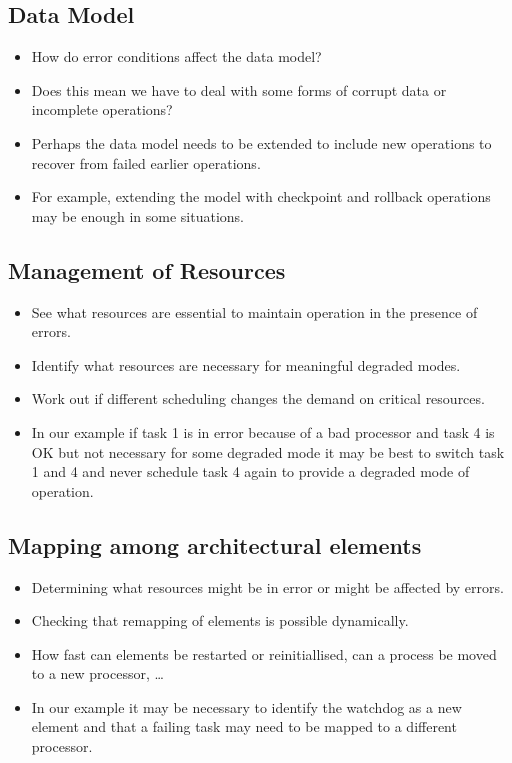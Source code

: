 \documentclass{report}
\begin{document}
\subsection{Data Model}
\begin{itemize}
\item{How do error conditions affect the data model?}
\item{Does this mean we have to deal with some forms of corrupt data or incomplete operations?}
\item{Perhaps the data model needs to be extended to include new operations to recover from failed earlier operations.}
\item{For example, extending the model with checkpoint and rollback operations may be enough in some situations.}
\end{itemize}

\subsection{Management of Resources}
\begin{itemize}
\item{See what resources are essential to maintain operation in the presence of errors.}
\item{Identify what resources are necessary for meaningful degraded modes.}
\item{Work out if different scheduling changes the demand on critical resources.}
\item{In our example if task 1 is in error because of a bad processor and task 4 is OK but not necessary for some degraded mode it may be best to switch task 1 and 4 and never schedule task 4 again to provide a degraded mode of operation.}
\end{itemize}

\subsection{Mapping among architectural elements}
\begin{itemize}
\item{Determining what resources might be in error or might be affected by errors.}
\item{Checking that remapping of elements is possible dynamically.}
\item{How fast can elements be restarted or reinitiallised, can a process be moved to a new processor, …}
\item{In our example it may be necessary to identify the watchdog as a new element and that a failing task may need to be mapped to a different processor.}
\end{itemize}
\end{document}

